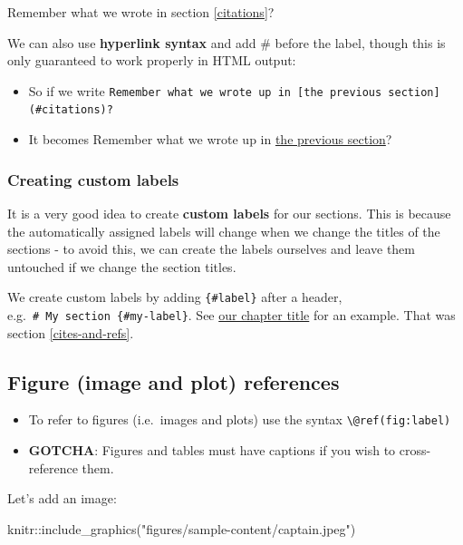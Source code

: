 \documentclass[a4paper, nobind]{templates/ociamthesis}
\providecommand{\tightlist}{%
  \setlength{\itemsep}{0pt}\setlength{\parskip}{0pt}}
\newenvironment{Shaded}{\begin{snugshade}}{\end{snugshade}}
\newcommand{\FunctionTok}[1]{\textcolor[rgb]{0.00,0.00,0.00}{#1}}
\newcommand{\NormalTok}[1]{#1}
\newcommand{\SpecialCharTok}[1]{\textcolor[rgb]{0.00,0.00,0.00}{#1}}
\newcommand{\StringTok}[1]{\textcolor[rgb]{0.31,0.60,0.02}{#1}}
\renewenvironment{Shaded}
{
  \vspace{10pt}%
  \begin{snugshade}%
}{%
  \end{snugshade}%
  \vspace{8pt}%
}
\begin{document}
Remember what we wrote in section \ref{citations}?

We can also use \textbf{hyperlink syntax} and add \# before the label, though this is only guaranteed to work properly in HTML output:

\begin{itemize}
\tightlist
\item
  So if we write \texttt{Remember\ what\ we\ wrote\ up\ in\ {[}the\ previous\ section{]}(\#citations)?}
\item
  It becomes Remember what we wrote up in \protect\hyperlink{citations}{the previous section}?
\end{itemize}

\hypertarget{creating-custom-labels}{%
\subsubsection{Creating custom labels}\label{creating-custom-labels}}

It is a very good idea to create \textbf{custom labels} for our sections. This is because the automatically assigned labels will change when we change the titles of the sections - to avoid this, we can create the labels ourselves and leave them untouched if we change the section titles.

We create custom labels by adding \texttt{\{\#label\}} after a header, e.g.~\texttt{\#\ My\ section\ \{\#my-label\}}.
See \protect\hyperlink{cites-and-refs}{our chapter title} for an example. That was section \ref{cites-and-refs}.

\hypertarget{figure-image-and-plot-references}{%
\subsection{Figure (image and plot) references}\label{figure-image-and-plot-references}}

\begin{itemize}
\tightlist
\item
  To refer to figures (i.e.~images and plots) use the syntax \texttt{\textbackslash{}@ref(fig:label)}
\item
  \textbf{GOTCHA}: Figures and tables must have captions if you wish to cross-reference them.
\end{itemize}

Let's add an image:

\begin{Shaded}
\begin{Highlighting}[]
\NormalTok{knitr}\SpecialCharTok{::}\FunctionTok{include\_graphics}\NormalTok{(}\StringTok{"figures/sample{-}content/captain.jpeg"}\NormalTok{)}
\end{Highlighting}
\end{Shaded}
\end{document}
